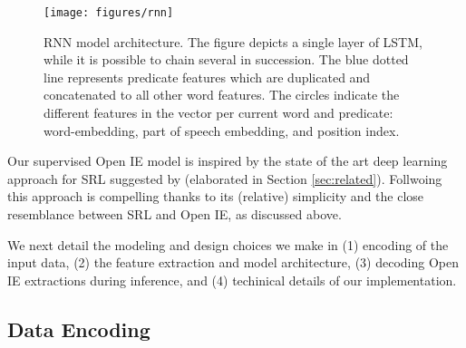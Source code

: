 \begin{figure*}[t!]

  \centering
    \texttt{[image: figures/rnn]}

    \caption{RNN model architecture. The figure depicts a single layer of LSTM, while it is possible to
      chain several in succession. The blue dotted line represents predicate features which are duplicated and concatenated to all other word features. The circles indicate the different features in the vector per current word and predicate: word-embedding, part of speech embedding, and position index.}
  \label{fig:architecture}

\end{figure*}

Our supervised Open IE model is inspired by the state of the art deep learning approach for SRL suggested by  (elaborated in Section \ref{sec:related}).
Follwoing this approach is compelling thanks to its (relative) simplicity and the close resemblance between SRL and Open IE, as discussed above. 

We next detail the modeling and design choices we make in
(1) encoding of the input data,
(2) the feature extraction and model architecture,
(3) decoding Open IE extractions during inference, and 
(4) techinical details of our implementation.


\subsection{Data Encoding}
\label{sec:encoding}



